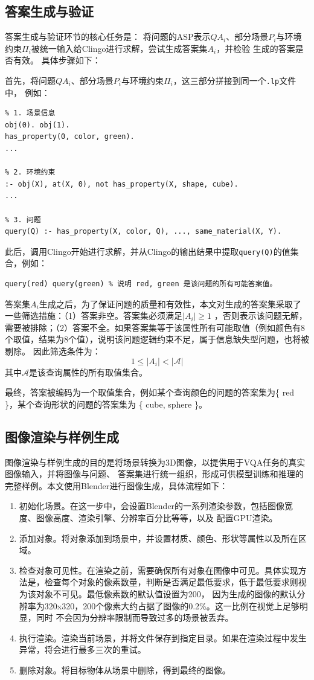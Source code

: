 \subsection{答案生成与验证}
答案生成与验证环节的核心任务是：
将问题的ASP表示$QA_i$、部分场景$P_i$与环境约束$\Pi_i$被统一输入给Clingo进行求解，尝试生成答案集$A_i$，并检验
生成的答案是否有效。
具体步骤如下：

首先，将问题$QA_i$、部分场景$P_i$与环境约束$\Pi_i$，这三部分拼接到同一个\texttt{.lp}文件中，
例如：
\begin{lstlisting}
% 1. 场景信息
obj(0). obj(1).
has_property(0, color, green).
...

% 2. 环境约束
:- obj(X), at(X, 0), not has_property(X, shape, cube).
...

% 3. 问题
query(Q) :- has_property(X, color, Q), ..., same_material(X, Y).
\end{lstlisting}

此后，调用Clingo开始进行求解，并从Clingo的输出结果中提取\texttt{query(Q)}的值集合，例如：
\begin{lstlisting}
query(red) query(green) % 说明 red, green 是该问题的所有可能答案值。
\end{lstlisting}

答案集$A_i$生成之后，为了保证问题的质量和有效性，本文对生成的答案集采取了一些筛选措施：（1）答案非空。答案集必须满足$|A_i| \geq 1$
，否则表示该问题无解，需要被排除；（2）答案不全。如果答案集等于该属性所有可能取值（例如颜色有8个取值，结果为8个值），说明该问题逻辑约束不足，属于信息缺失型问题，也将被剔除。
因此筛选条件为：
$$1 \leq |A_i| < |\mathcal{A} |$$
其中$\mathcal{A} $是该查询属性的所有取值集合。

最终，答案被编码为一个取值集合，例如某个查询颜色的问题的答案集为\{ red \}，某个查询形状的问题的答案集为
\{ cube, sphere \}。
\subsection{图像渲染与样例生成}
图像渲染与样例生成的目的是将场景转换为3D图像，以提供用于VQA任务的真实图像输入，并将图像与问题、
答案集进行统一组织，形成可供模型训练和推理的完整样例。本文使用Blender进行图像生成，具体流程如下：
\begin{enumerate}[nosep]
\item 初始化场景。在这一步中，会设置Blender的一系列渲染参数，包括图像宽度、图像高度、渲染引擎、分辨率百分比等等，以及
配置GPU渲染。
\item 添加对象。将对象添加到场景中，并设置材质、颜色、形状等属性以及所在区域。
\item 检查对象可见性。在渲染之前，需要确保所有对象在图像中可见。具体实现方法是，检查每个对象的像素数量，判断是否满足最低要求，低于最低要求则视为该对象不可见。最低像素数的默认值设置为200，
因为生成的图像的默认分辨率为320x320，200个像素大约占据了图像的0.2\%。这一比例在视觉上足够明显，同时
不会因为分辨率限制而导致过多的场景被丢弃。
\item 执行渲染。渲染当前场景，并将文件保存到指定目录。如果在渲染过程中发生异常，将会进行最多三次的重试。
\item 删除对象。将目标物体从场景中删除，得到最终的图像。
\end{enumerate}

